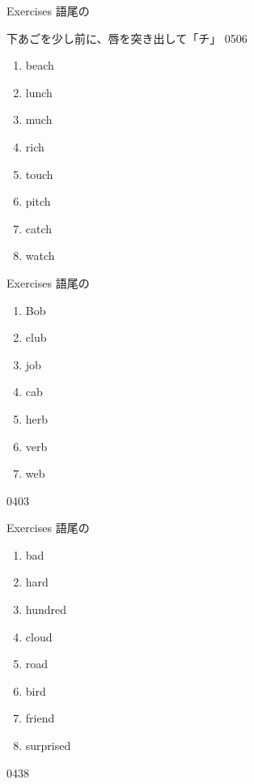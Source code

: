 \documentclass[aspectratio=169,xcolor={dvipsnames,table}]{beamer}
\begin{document}
\begin{frame}[plain,t]{Exercises 語尾の}

   下あごを少し前に、唇を突き出して「チ」%
  \hfill{\tiny 0506}\,{\scriptsize {}}

  \Large
  \begin{enumerate}
    \item beach
    \item lunch
    \item much
    \item rich
    \item touch
    \item pitch
    \item catch
    \item watch
  \end{enumerate}

\end{frame}
\begin{frame}[plain]{Exercises 語尾の}
  \Large
  \begin{enumerate}
    \item Bob
    \item club
    \item job
    \item cab
    \item herb
    \item verb
    \item web
  \end{enumerate}

  \hfill{\tiny 0403}\,{\scriptsize {}}\end{frame}
\begin{frame}[plain]{Exercises 語尾の}
  \Large
  \begin{enumerate}
    \item bad
    \item hard
    \item hundred
    \item cloud
    \item road
    \item bird
    \item friend
    \item surprised
  \end{enumerate}

  \hfill{\tiny 0438}\,{\scriptsize {}}\end{frame}
\end{document}

